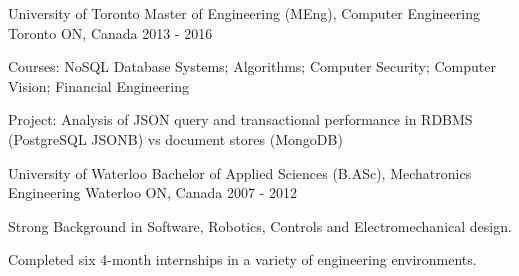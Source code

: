 

\begin{cventries}

  \cventry
    {University of Toronto} %
    {Master of Engineering (MEng), Computer Engineering} %
    {Toronto ON, Canada} %
    {2013 - 2016} %
    {
      \begin{cvitems} %
        \item {Courses: NoSQL Database Systems; Algorithms; Computer Security; Computer Vision; Financial Engineering}
		\item {Project: Analysis of JSON query and transactional performance in RDBMS (PostgreSQL JSONB) vs document stores (MongoDB)}
      \end{cvitems}
    }

  \cventry
    {University of Waterloo} %
    {Bachelor of Applied Sciences (B.ASc), Mechatronics Engineering} %
    {Waterloo ON, Canada} %
    {2007 - 2012} %
    {
      \begin{cvitems} %
        \item {Strong Background in Software, Robotics, Controls and Electromechanical design.}
        \item {Completed six 4-month internships in a variety of engineering environments.}
      \end{cvitems}
    }

\end{cventries}
